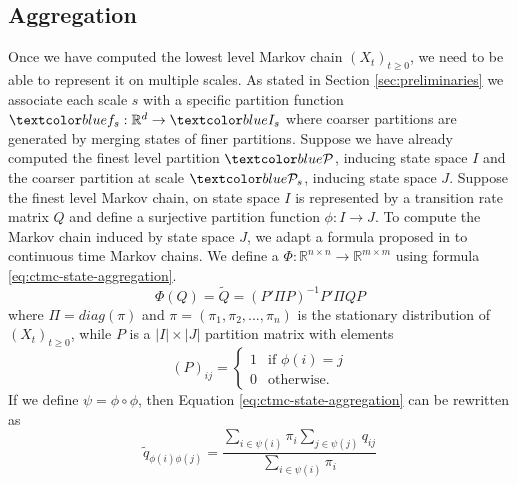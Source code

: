 \subsection{Aggregation}

Once we have computed the lowest level Markov chain $(X_t)_{t \ge 0}$, we need to be able to represent it on multiple scales.
As stated in Section \ref{sec:preliminaries} we associate each scale $s$ with a specific partition function
$\lstopar{f_s}: \mathbb{R}^d \rightarrow \lstopar{I_s}$ where coarser partitions are generated by merging 
states of finer partitions.
Suppose we have already computed the finest level partition $\lstopar{\cP}$, inducing state space $I$ and the
coarser partition at scale $\lstopar{\cP_s}$, inducing state space $J$. Suppose the finest level Markov chain,
on state space $I$ is represented by a transition rate matrix $Q$ and define a surjective partition function
$\phi: I \rightarrow J$. To compute the Markov chain induced by state space $J$, we adapt a formula proposed
in \cite{5746509} to continuous time Markov chains. We define a 
$\Phi: \mathbb{R}^{n \times n} \rightarrow \mathbb{R}^{m \times m}$ using formula \ref{eq:ctmc-state-aggregation}.
\begin{equation}
	\label{eq:ctmc-state-aggregation}
	\Phi(Q) = \tilde{Q} = (P' \Pi P)^{-1} P' \Pi Q P
\end{equation}
where $\Pi = diag(\pi)$ and $\pi = (\pi_1, \pi_2, ..., \pi_n)$ is the stationary distribution of $(X_t)_{t \ge 0}$, while $P$ is a 
$|I| \times |J|$ partition matrix with elements
\begin{equation}
	\nonumber
	\left(P\right)_{ij} = 
		\left\{
			\begin{array}{ll}
				1 & \mbox{if } \phi(i) = j \\
				0 & \mbox{otherwise}.
			\end{array}
		\right.
\end{equation}
If we define $\psi = \phi \circ \phi$, then Equation \ref{eq:ctmc-state-aggregation} can be rewritten as
\begin{equation}
	\nonumber
	\tilde{q}_{\phi(i)\phi(j)} = \frac{\sum\limits_{i \in \psi(i)}\pi_i \sum\limits_{j \in \psi(j)} q_{ij}}{\sum\limits_{i \in \psi(i)}\pi_i}
\end{equation}